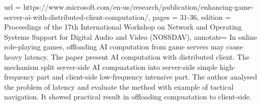 {  url = {https://www.microsoft.com/en-us/research/publication/enhancing-game-server-ai-with-distributed-client-computation/},
  pages = {31-36},
  edition = {Proceedings of the 17th International Workshop on Network and Operating Systems Support for Digital Audio and Video (NOSSDAV)},
  annotate={ In online role-playing games, offloading AI computation from game servers may cause heavy latency. The paper present AI computation with distributed client. The mechanism split server-side AI compuatation into server-side simple high-frequency part and client-side low-frequency intensive part. The author analysed the problem of latency and evaluate the method with example of tactical navigation. It showed practical result in offloading compuatation to client-side. }
}

